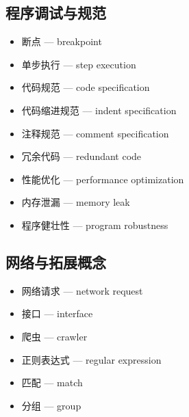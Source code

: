 \subsection{程序调试与规范}
\begin{itemize}
\item 断点 — breakpoint
\item 单步执行 — step execution
\item 代码规范 — code specification
\item 代码缩进规范 — indent specification
\item 注释规范 — comment specification
\item 冗余代码 — redundant code
\item 性能优化 — performance optimization
\item 内存泄漏 — memory leak
\item 程序健壮性 — program robustness
\end{itemize}

\subsection{网络与拓展概念}
\begin{itemize}
\item 网络请求 — network request
\item 接口 — interface
\item 爬虫 — crawler
\item 正则表达式 — regular expression
\item 匹配 — match
\item 分组 — group
\end{itemize}
